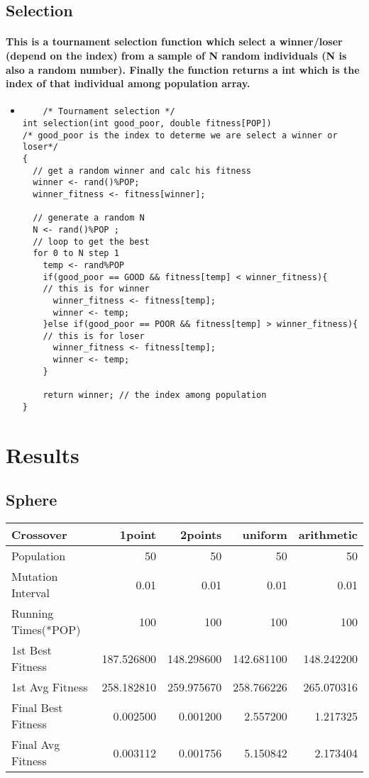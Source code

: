 \documentclass[12pt]{article}
\begin{document}
\subsection{Selection}
\paragraph{This is a tournament selection function which select a winner/loser (depend on the index) from a sample of N random individuals (N is also a random number). Finally the function returns a int which is the index of that individual among population array.}
\begin{itemize}
\item 
	\begin{lstlisting}
	/* Tournament selection */
int selection(int good_poor, double fitness[POP]) 
/* good_poor is the index to determe we are select a winner or loser*/
{
  // get a random winner and calc his fitness
  winner <- rand()%POP;
  winner_fitness <- fitness[winner];
  
  // generate a random N
  N <- rand()%POP ;
  // loop to get the best
  for 0 to N step 1
    temp <- rand%POP
    if(good_poor == GOOD && fitness[temp] < winner_fitness){		
    // this is for winner
      winner_fitness <- fitness[temp];
      winner <- temp;
    }else if(good_poor == POOR && fitness[temp] > winner_fitness){	
    // this is for loser
      winner_fitness <- fitness[temp];
      winner <- temp;
    }
    
    return winner; // the index among population
}
	\end{lstlisting}
\end{itemize}


\section{Results}
\subsection{Sphere}
\begin{center}
	\begin{tabular}{| l | r | r | r | r | }
	\hline
	\bf Crossover & \bf 1point & \bf 2points & \bf uniform & \bf  arithmetic \\
	\hline
	Population & 50 & 50 & 50 & 50 \\
	Mutation Interval & 0.01 & 0.01 & 0.01 & 0.01 \\
	Running Times(*POP) & 100 & 100 & 100 & 100 \\
	1st Best Fitness & 187.526800 & 148.298600 & 142.681100 & 148.242200 \\
	1st Avg Fitness & 258.182810 & 259.975670 & 258.766226 & 265.070316 \\
	Final Best Fitness &  0.002500 & 0.001200 & 2.557200 & 1.217325 \\
	Final Avg Fitness & 0.003112 & 0.001756 & 5.150842 &  2.173404 \\
	\hline
	\end{tabular}
	\end{center}
	
\end{document}
